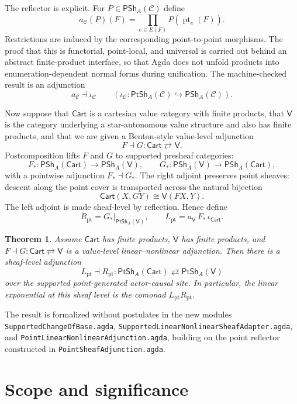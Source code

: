 \documentclass[10pt]{article}
\newtheorem*{theorem}{Theorem}
\newcommand{\PSh}{\mathsf{PSh}}
\newcommand{\PtSh}{\mathsf{PtSh}}
\newcommand{\Cart}{\mathsf{Cart}}
\newcommand{\Vcat}{\mathsf{V}}
\begin{document}
The reflector is explicit.  For $P \in \PSh_A(\mathcal C)$ define
\[
  a_{\mathcal C}(P)(F) = \prod_{e\in E(F)} P(\operatorname{pt}_e(F)).
\]
Restrictions are induced by the corresponding point-to-point morphisms.  The proof that this is functorial, point-local, and universal is carried out behind an abstract finite-product interface, so that Agda does not unfold products into enumeration-dependent normal forms during unification.  The machine-checked result is an adjunction
\[
  a_{\mathcal C} \dashv \iota_{\mathcal C}
  \qquad
  (\iota_{\mathcal C}:\PtSh_A(\mathcal C)\hookrightarrow\PSh_A(\mathcal C)).
\]

Now suppose that $\Cart$ is a cartesian value category with finite products, that $\Vcat$ is the category underlying a star-autonomous value structure and also has finite products, and that we are given a Benton-style value-level adjunction
\[
  F \dashv G : \Cart \rightleftarrows \Vcat .
\]
Postcomposition lifts $F$ and $G$ to supported presheaf categories:
\[
  F_* : \PSh_A(\Cart) \to \PSh_A(\Vcat),
  \qquad
  G_* : \PSh_A(\Vcat) \to \PSh_A(\Cart),
\]
with a pointwise adjunction $F_*\dashv G_*$.  The right adjoint preserves point sheaves: descent along the point cover is transported across the natural bijection
\[
  \Cart(X, GY) \cong \Vcat(FX,Y).
\]
The left adjoint is made sheaf-level by reflection.  Hence define
\[
  R_{\mathrm{pt}} = G_*\vert_{\PtSh_A(\Vcat)},
  \qquad
  L_{\mathrm{pt}} = a_{\Vcat}\,F_*\,\iota_{\Cart}.
\]

\begin{theorem}
Assume $\Cart$ has finite products, $\Vcat$ has finite products, and $F\dashv G:\Cart\rightleftarrows\Vcat$ is a value-level linear--nonlinear adjunction.  Then there is a sheaf-level adjunction
\[
  L_{\mathrm{pt}} \dashv R_{\mathrm{pt}} :
  \PtSh_A(\Cart) \rightleftarrows \PtSh_A(\Vcat)
\]
over the supported point-generated actor-causal site.  In particular, the linear exponential at this sheaf level is the comonad $L_{\mathrm{pt}}R_{\mathrm{pt}}$.
\end{theorem}

The result is formalized without postulates in the new modules \texttt{SupportedChangeOfBase.agda}, \texttt{SupportedLinearNonlinearSheafAdapter.agda}, and \texttt{PointLinearNonlinearAdjunction.agda}, building on the point reflector constructed in \texttt{PointSheafAdjunction.agda}.

\section*{Scope and significance}
\end{document}
